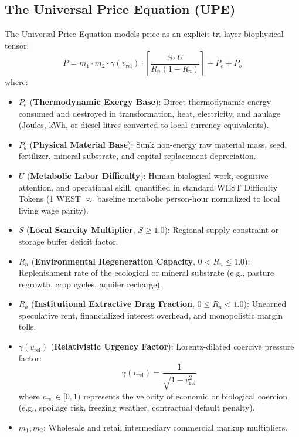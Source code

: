 \documentclass[preprint,12pt,authoryear]{elsarticle}
\begin{document}
\subsection{The Universal Price Equation (UPE)}
The Universal Price Equation models price as an explicit tri-layer biophysical tensor:
\begin{equation}
P = m_1 \cdot m_2 \cdot \gamma(v_{\text{rel}}) \cdot \left[ \frac{S \cdot U}{R_n (1 - R_a)} \right] + P_e + P_b
\label{eq:upe}
\end{equation}
where:
\begin{itemize}
    \item $P_e$ (\textbf{Thermodynamic Exergy Base}): Direct thermodynamic energy consumed and destroyed in transformation, heat, electricity, and haulage (Joules, kWh, or diesel litres converted to local currency equivalents).
    \item $P_b$ (\textbf{Physical Material Base}): Sunk non-energy raw material mass, seed, fertilizer, mineral substrate, and capital replacement depreciation.
    \item $U$ (\textbf{Metabolic Labor Difficulty}): Human biological work, cognitive attention, and operational skill, quantified in standard WEST Difficulty Tokens (1 WEST $\approx$ baseline metabolic person-hour normalized to local living wage parity).
    \item $S$ (\textbf{Local Scarcity Multiplier}, $S \ge 1.0$): Regional supply constraint or storage buffer deficit factor.
    \item $R_n$ (\textbf{Environmental Regeneration Capacity}, $0 < R_n \le 1.0$): Replenishment rate of the ecological or mineral substrate (e.g., pasture regrowth, crop cycles, aquifer recharge).
    \item $R_a$ (\textbf{Institutional Extractive Drag Fraction}, $0 \le R_a < 1.0$): Unearned speculative rent, financialized interest overhead, and monopolistic margin tolls.
    \item $\gamma(v_{\text{rel}})$ (\textbf{Relativistic Urgency Factor}): Lorentz-dilated coercive pressure factor:
    \begin{equation}
    \gamma(v_{\text{rel}}) = \frac{1}{\sqrt{1 - v_{\text{rel}}^2}}
    \end{equation}
    where $v_{\text{rel}} \in [0, 1)$ represents the velocity of economic or biological coercion (e.g., spoilage risk, freezing weather, contractual default penalty).
    \item $m_1, m_2$: Wholesale and retail intermediary commercial markup multipliers.
\end{itemize}
\end{document}
